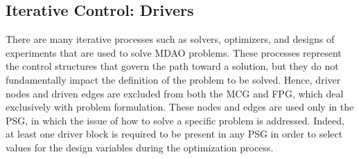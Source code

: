 \subsection{Iterative Control: Drivers}
  There are many iterative processes  such as 
  solvers, optimizers, and designs of experiments that are used to solve MDAO problems. 
  These processes represent the control structures that govern the path toward a solution, but they do not fundamentally impact the definition of the 
  problem to be solved. Hence, driver 
  nodes and driven edges are excluded from both the MCG and FPG, which deal exclusively 
  with problem formulation. These nodes and edges are used only in the PSG, in which the issue of 
  how to solve a specific problem is addressed. Indeed, at least one driver block is 
  required to be present in any PSG in order to select values for the design variables during the optimization process. 





